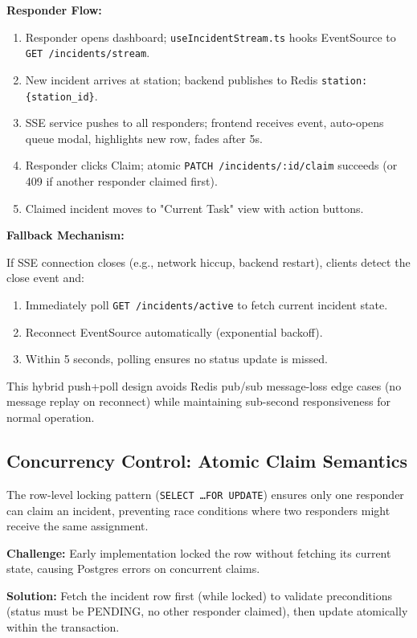 \textbf{Responder Flow:}
\begin{enumerate}
  \item Responder opens dashboard; \texttt{useIncidentStream.ts} hooks EventSource to \texttt{GET /incidents/stream}.
  \item New incident arrives at station; backend publishes to Redis \texttt{station:\{station\_id\}}.
  \item SSE service pushes to all responders; frontend receives event, auto-opens queue modal, highlights new row, fades after 5s.
  \item Responder clicks Claim; atomic \texttt{PATCH /incidents/:id/claim} succeeds (or 409 if another responder claimed first).
  \item Claimed incident moves to "Current Task" view with action buttons.
\end{enumerate}

\textbf{Fallback Mechanism:}

If SSE connection closes (e.g., network hiccup, backend restart), clients detect the close event and:
\begin{enumerate}
  \item Immediately poll \texttt{GET /incidents/active} to fetch current incident state.
  \item Reconnect EventSource automatically (exponential backoff).
  \item Within 5 seconds, polling ensures no status update is missed.
\end{enumerate}

This hybrid push+poll design avoids Redis pub/sub message-loss edge cases (no message replay on reconnect) while maintaining sub-second responsiveness for normal operation.

\subsection{Concurrency Control: Atomic Claim Semantics}

The row-level locking pattern (\texttt{SELECT \ldots FOR UPDATE}) ensures only one responder can claim an incident, preventing race conditions where two responders might receive the same assignment.

\textbf{Challenge:} Early implementation locked the row without fetching its current state, causing Postgres errors on concurrent claims.

\textbf{Solution:} Fetch the incident row first (while locked) to validate preconditions (status must be PENDING, no other responder claimed), then update atomically within the transaction.


